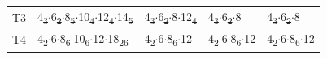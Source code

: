 \documentclass[preprint,numrefs,noinfo,sort&compress]{elsarticle}
\providecommand{\DIFadd}[1]{{\protect\color{blue}\uwave{#1}}} %
\providecommand{\DIFdel}[1]{{\protect\color{red}\sout{#1}}}                      %
\providecommand{\DIFaddFL}[1]{\DIFadd{#1}} %
\providecommand{\DIFdelFL}[1]{\DIFdel{#1}} %
\providecommand{\DIFaddbeginFL}{} %
\providecommand{\DIFaddendFL}{} %
\providecommand{\DIFdelbeginFL}{} %
\providecommand{\DIFdelendFL}{} %
\newcommand{\DIFscaledelfig}{0.5}
\newlength{\DIFdelgraphicswidth} %
\newlength{\DIFdelgraphicsheight} %
\newcommand{\DIFaddincludegraphics}[2][]{{\color{blue}\fbox{\DIFOincludegraphics[#1]{#2}}}} %
\newcommand{\DIFdelincludegraphics}[2][]{%
\sbox{\DIFdelgraphicsbox}{\DIFOincludegraphics[#1]{#2}}%
\settoboxwidth{\DIFdelgraphicswidth}{\DIFdelgraphicsbox} %
\settoboxtotalheight{\DIFdelgraphicsheight}{\DIFdelgraphicsbox} %
\scalebox{\DIFscaledelfig}{%
\parbox[b]{\DIFdelgraphicswidth}{\usebox{\DIFdelgraphicsbox}\\[-\baselineskip] \rule{\DIFdelgraphicswidth}{0em}}\llap{\resizebox{\DIFdelgraphicswidth}{\DIFdelgraphicsheight}{%
\setlength{\unitlength}{\DIFdelgraphicswidth}%
\begin{picture}(1,1)%
\thicklines\linethickness{2pt} %
{\color[rgb]{1,0,0}\put(0,0){\framebox(1,1){}}}%
{\color[rgb]{1,0,0}\put(0,0){\line( 1,1){1}}}%
{\color[rgb]{1,0,0}\put(0,1){\line(1,-1){1}}}%
\end{picture}%
}\hspace*{3pt}}} %
} %
\DeclareRobustCommand{\DIFaddbeginFL}{\DIFOaddbeginFL \let\includegraphics\DIFaddincludegraphics} %
\DeclareRobustCommand{\DIFaddendFL}{\DIFOaddendFL \let\includegraphics\DIFOincludegraphics} %
\DeclareRobustCommand{\DIFdelbeginFL}{\DIFOdelbeginFL \let\includegraphics\DIFdelincludegraphics} %
\DeclareRobustCommand{\DIFdelendFL}{\DIFOaddendFL \let\includegraphics\DIFOincludegraphics} %
\begin{document}
\begin{table}
\begin{threeparttable}
{\begin{tabular}{lllll}
T3 & 4\DIFdelbeginFL \DIFdelFL{\textsubscript{3}\(\cdot\)}\DIFdelendFL \DIFaddbeginFL \DIFaddFL{\(_{\text{3}} \cdot\)}\DIFaddendFL 6\DIFdelbeginFL \DIFdelFL{\textsubscript{2}\(\cdot\)}\DIFdelendFL \DIFaddbeginFL \DIFaddFL{\(_{\text{2}} \cdot\)}\DIFaddendFL 8\DIFdelbeginFL \DIFdelFL{\textsubscript{5}\(\cdot\)}\DIFdelendFL \DIFaddbeginFL \DIFaddFL{\(_{\text{5}} \cdot\)}\DIFaddendFL 10\DIFdelbeginFL \DIFdelFL{\textsubscript{4}\(\cdot\)}\DIFdelendFL \DIFaddbeginFL \DIFaddFL{\(_{\text{4}} \cdot\)}\DIFaddendFL 12\DIFdelbeginFL \DIFdelFL{\textsubscript{4}\(\cdot\)}\DIFdelendFL \DIFaddbeginFL \DIFaddFL{\(_{\text{4}} \cdot\)}\DIFaddendFL 14\DIFdelbeginFL \DIFdelFL{\textsubscript{5} }\DIFdelendFL \DIFaddbeginFL \DIFaddFL{\(_{\text{5}}\) }\DIFaddendFL & 4\DIFdelbeginFL \DIFdelFL{\textsubscript{3}\(\cdot\)}\DIFdelendFL \DIFaddbeginFL \DIFaddFL{\(_{\text{3}} \cdot\)}\DIFaddendFL 6\DIFdelbeginFL \DIFdelFL{\textsubscript{2}\(\cdot\)}\DIFdelendFL \DIFaddbeginFL \DIFaddFL{\(_{\text{2}} \cdot\)}\DIFaddendFL 8\(\cdot\)12\DIFdelbeginFL \DIFdelFL{\textsubscript{4} }\DIFdelendFL \DIFaddbeginFL \DIFaddFL{\(_{\text{4}}\) }\DIFaddendFL & 4\DIFdelbeginFL \DIFdelFL{\textsubscript{3}\(\cdot\)}\DIFdelendFL \DIFaddbeginFL \DIFaddFL{\(_{\text{3}} \cdot\)}\DIFaddendFL 6\DIFdelbeginFL \DIFdelFL{\textsubscript{2}\(\cdot\)}\DIFdelendFL \DIFaddbeginFL \DIFaddFL{\(_{\text{2}} \cdot\)}\DIFaddendFL 8 & 4\DIFdelbeginFL \DIFdelFL{\textsubscript{3}\(\cdot\)}\DIFdelendFL \DIFaddbeginFL \DIFaddFL{\(_{\text{3}} \cdot\)}\DIFaddendFL 6\DIFdelbeginFL \DIFdelFL{\textsubscript{2}\(\cdot\)}\DIFdelendFL \DIFaddbeginFL \DIFaddFL{\(_{\text{2}} \cdot\)}\DIFaddendFL 8\\
T4 & 4\DIFdelbeginFL \DIFdelFL{\textsubscript{2}\(\cdot\)}\DIFdelendFL \DIFaddbeginFL \DIFaddFL{\(_{\text{2}} \cdot\)}\DIFaddendFL 6\(\cdot\)8\DIFdelbeginFL \DIFdelFL{\textsubscript{6}\(\cdot\)}\DIFdelendFL \DIFaddbeginFL \DIFaddFL{\(_{\text{6}} \cdot\)}\DIFaddendFL 10\DIFdelbeginFL \DIFdelFL{\textsubscript{6}\(\cdot\)}\DIFdelendFL \DIFaddbeginFL \DIFaddFL{\(_{\text{6}} \cdot\)}\DIFaddendFL 12\(\cdot\)18\DIFdelbeginFL \DIFdelFL{\textsubscript{26} }\DIFdelendFL \DIFaddbeginFL \DIFaddFL{\(_{\text{26}}\) }\DIFaddendFL & 4\DIFdelbeginFL \DIFdelFL{\textsubscript{2}\(\cdot\)}\DIFdelendFL \DIFaddbeginFL \DIFaddFL{\(_{\text{2}} \cdot\)}\DIFaddendFL 6\(\cdot\)8\DIFdelbeginFL \DIFdelFL{\textsubscript{6}\(\cdot\)}\DIFdelendFL \DIFaddbeginFL \DIFaddFL{\(_{\text{6}} \cdot\)}\DIFaddendFL 12 & 4\DIFdelbeginFL \DIFdelFL{\textsubscript{2}\(\cdot\)}\DIFdelendFL \DIFaddbeginFL \DIFaddFL{\(_{\text{2}} \cdot\)}\DIFaddendFL 6\(\cdot\)8\DIFdelbeginFL \DIFdelFL{\textsubscript{6}\(\cdot\)}\DIFdelendFL \DIFaddbeginFL \DIFaddFL{\(_{\text{6}} \cdot\)}\DIFaddendFL 12 & 4\DIFdelbeginFL \DIFdelFL{\textsubscript{2}\(\cdot\)}\DIFdelendFL \DIFaddbeginFL \DIFaddFL{\(_{\text{2}} \cdot\)}\DIFaddendFL 6\(\cdot\)8\DIFdelbeginFL \DIFdelFL{\textsubscript{6}\(\cdot\)}\DIFdelendFL \DIFaddbeginFL \DIFaddFL{\(_{\text{6}} \cdot\)}\DIFaddendFL 12\\

\end{tabular}}
\end{threeparttable}
\end{table}
\end{document}
